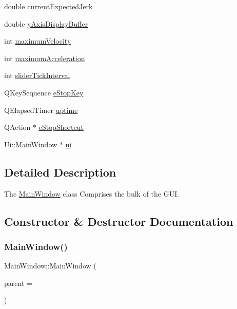 \begin{DoxyCompactItemize}
\item 
double \hyperlink{class_main_window_a380cbb9e901211a3c8fc685cea11c8f9}{current\+Expected\+Jerk}
\item 
double \hyperlink{class_main_window_a1f9fdf363545300d34f5aee2dddb1ff5}{y\+Axis\+Display\+Buffer}
\item 
int \hyperlink{class_main_window_a14e66dcaf2393eed660d558651b07e94}{maximum\+Velocity}
\item 
int \hyperlink{class_main_window_a6b3e09f92d0e995e5c349d6658121364}{maximum\+Acceleration}
\item 
int \hyperlink{class_main_window_a304d68be05ae4cd7086236120933ebcd}{slider\+Tick\+Interval}
\item 
Q\+Key\+Sequence \hyperlink{class_main_window_ad869af059f93289fa358e55d881d20a0}{e\+Stop\+Key}
\item 
Q\+Elapsed\+Timer \hyperlink{class_main_window_af999866626ad70973845e180fe7666f8}{uptime}
\item 
Q\+Action $\ast$ \hyperlink{class_main_window_a0efaeedddca035b6a26ebf229b4ce6ae}{e\+Stop\+Shortcut}
\item 
Ui\+::\+Main\+Window $\ast$ \hyperlink{class_main_window_a35466a70ed47252a0191168126a352a5}{ui}
\end{DoxyCompactItemize}


\subsection{Detailed Description}
The \hyperlink{class_main_window}{Main\+Window} class Comprises the bulk of the G\+UI. 

\subsection{Constructor \& Destructor Documentation}
\hypertarget{class_main_window_a8b244be8b7b7db1b08de2a2acb9409db}{}\label{class_main_window_a8b244be8b7b7db1b08de2a2acb9409db} 
\subsubsection{\texorpdfstring{Main\+Window()}{MainWindow()}}
{\footnotesize\ttfamily Main\+Window\+::\+Main\+Window (\begin{DoxyParamCaption}\item[{Q\+Widget $\ast$}]{parent = {} }\end{DoxyParamCaption})\hspace{0.3cm}{\ttfamily [explicit]}}




